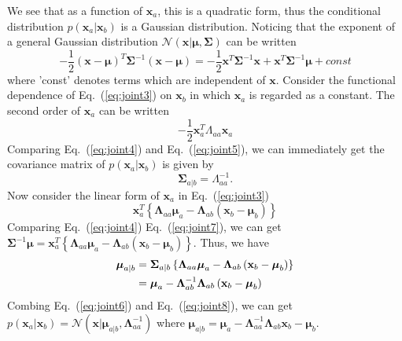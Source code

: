 \documentclass{article}
\begin{document}
   \par We see that as a function of $\mathbf{x}_a$, this is a quadratic form, thus the conditional distribution $p\left(\mathbf{x}_a|\mathbf{x}_b\right)$ is a Gaussian distribution. Noticing that the exponent of a general Gaussian distribution $\mathcal{N}\left(\mathbf{x}|\boldsymbol{\mu},\mathbf{\Sigma}\right)$ can be written
   \begin{equation}
   -\frac{1}{2}\left(\mathbf{x} - \boldsymbol{\mu}\right)^{T}\boldsymbol{\Sigma}^{-1}\left(\mathbf{x}- \boldsymbol{\mu}\right) = -\frac{1}{2}\mathbf{x}^T\boldsymbol{\Sigma}^{-1}\mathbf{x} + \mathbf{x}^T\boldsymbol{\Sigma}^{-1}\boldsymbol{\mu}+const\label{eq:joint4}
   \end{equation} 
   where 'const' denotes terms which are independent of $\mathbf{x}$. Consider the functional dependence of Eq.~(\ref{eq:joint3}) on $\mathbf{x}_b$ in which $\mathbf{x}_a$ is regarded as a constant. The second order of $\mathbf{x}_a$ can be written
   \begin{equation}
   -\frac{1}{2}\mathbf{x}_a^T\Lambda_{aa}\mathbf{x}_{a}\label{eq:joint5}
   \end{equation}
   Comparing Eq.~(\ref{eq:joint4}) and Eq.~(\ref{eq:joint5}), we can immediately get the covariance matrix of $p\left(\mathbf{x}_a|\mathbf{x}_b\right)$ is given by
   \begin{equation}
   \mathbf{\Sigma}_{a|b}=\Lambda_{aa}^{-1}\label{eq:joint6}.
   \end{equation} 
   Now consider the linear form of $\mathbf{x}_a$ in Eq.~(\ref{eq:joint3})
   \begin{equation}
   \mathbf{x}_a^T\left\{\boldsymbol{\Lambda}_{aa}\boldsymbol{\mu}_a - \boldsymbol{\Lambda}_{ab}\left(\mathbf{x}_b - \boldsymbol{\mu}_b\right)\right\}\label{eq:joint7}
   \end{equation}
   Comparing Eq.~(\ref{eq:joint4}) Eq.~(\ref{eq:joint7}), we can get $\boldsymbol{\Sigma}^{-1}\boldsymbol{\mu}=\mathbf{x}_a^T\left\{\boldsymbol{\Lambda}_{aa}\boldsymbol{\mu}_a - \boldsymbol{\Lambda}_{ab}\left(\mathbf{x}_b - \boldsymbol{\mu}_b\right)\right\}$. Thus, we have 
   \begin{align}
   \boldsymbol{\mu}_{a|b} &= \boldsymbol{\Sigma}_{a|b}\left\{\boldsymbol{\Lambda}_{aa}\boldsymbol{\mu}_a - \boldsymbol{\Lambda}_{ab}\left(\mathbf{x}_b - \boldsymbol{\mu}_b\right)\right\}\notag\\
   &= \boldsymbol{\mu}_a - \boldsymbol{\Lambda}_{ab}^{-1}\boldsymbol{\Lambda}_{ab}\left(\mathbf{x}_b - \boldsymbol{\mu}_b\right)\label{eq:joint8}
   \end{align}
   Combing Eq.~(\ref{eq:joint6}) and Eq.~(\ref{eq:joint8}), we can get $p\left(\mathbf{x}_a|\mathbf{x}_b\right) =\mathcal{N}\left(\mathbf{x}|\boldsymbol{\mu}_{a|b},\mathbf{\Lambda}_{aa}^{-1}\right)$ where $\boldsymbol{\mu}_{a|b} = \boldsymbol{\mu}_a - \mathbf{\Lambda}_{aa}^{-1}\mathbf{\Lambda}_{ab}\mathbf{x}_b - \boldsymbol{\mu}_b.$
\end{document}
